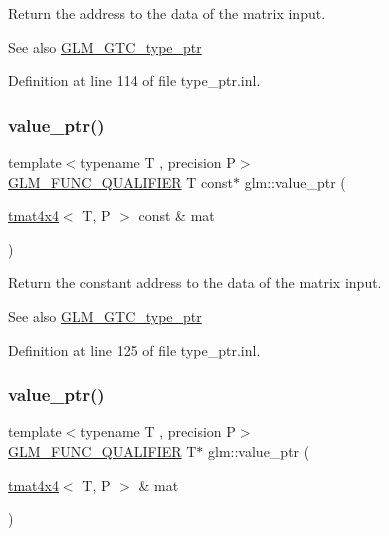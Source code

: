Return the address to the data of the matrix input. \begin{DoxySeeAlso}{See also}
\mbox{\hyperlink{group__gtc__type__ptr}{G\+L\+M\+\_\+\+G\+T\+C\+\_\+type\+\_\+ptr}} 
\end{DoxySeeAlso}


Definition at line 114 of file type\+\_\+ptr.\+inl.

\mbox{\label{group__gtc__type__ptr_ga2edadf5433694bf018d62db962b61321}} 
\subsubsection{\texorpdfstring{value\_ptr()}{value\_ptr()}\hspace{0.1cm}{\footnotesize\ttfamily [12/27]}}
{\footnotesize\ttfamily template$<$typename T , precision P$>$ \\
\mbox{\hyperlink{setup_8hpp_a33fdea6f91c5f834105f7415e2a64407}{G\+L\+M\+\_\+\+F\+U\+N\+C\+\_\+\+Q\+U\+A\+L\+I\+F\+I\+ER}} T const$\ast$ glm\+::value\+\_\+ptr (\begin{DoxyParamCaption}\item[{\mbox{\hyperlink{structglm_1_1tmat4x4}{tmat4x4}}$<$ T, P $>$ const \&}]{mat }\end{DoxyParamCaption})}

Return the constant address to the data of the matrix input. \begin{DoxySeeAlso}{See also}
\mbox{\hyperlink{group__gtc__type__ptr}{G\+L\+M\+\_\+\+G\+T\+C\+\_\+type\+\_\+ptr}} 
\end{DoxySeeAlso}


Definition at line 125 of file type\+\_\+ptr.\+inl.

\mbox{\label{group__gtc__type__ptr_ga1fc49ab60e5afdd4821a6903e92244a4}} 
\subsubsection{\texorpdfstring{value\_ptr()}{value\_ptr()}\hspace{0.1cm}{\footnotesize\ttfamily [13/27]}}
{\footnotesize\ttfamily template$<$typename T , precision P$>$ \\
\mbox{\hyperlink{setup_8hpp_a33fdea6f91c5f834105f7415e2a64407}{G\+L\+M\+\_\+\+F\+U\+N\+C\+\_\+\+Q\+U\+A\+L\+I\+F\+I\+ER}} T$\ast$ glm\+::value\+\_\+ptr (\begin{DoxyParamCaption}\item[{\mbox{\hyperlink{structglm_1_1tmat4x4}{tmat4x4}}$<$ T, P $>$ \&}]{mat }\end{DoxyParamCaption})}

